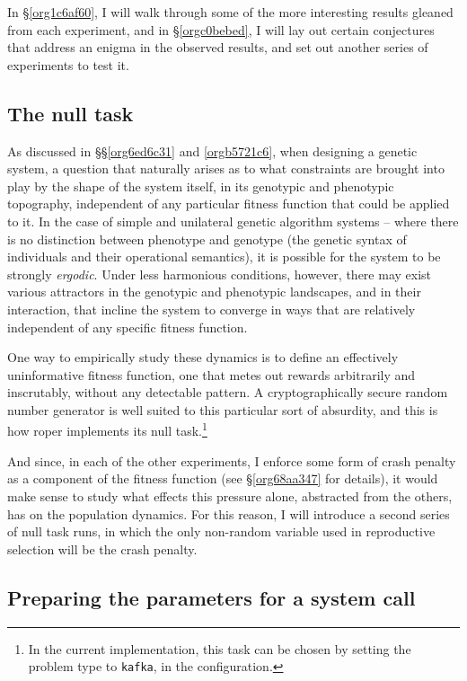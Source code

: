\documentclass[12pt,glossary]{dalthesis}
\begin{document}
In \S \ref{org1c6af60}, I will walk through some of the more interesting results
gleaned from each experiment, and in \S \ref{orgc0bebed}, I will lay out certain
conjectures that address an enigma in the observed results, and set out another
series of experiments to test it. 

\subsection{The null task}
\label{sec:org5f51691}
\label{org21258f9}

As discussed in \S\S \ref{org6ed6c31} and \ref{orgb5721c6}, when designing a genetic
system, a question that naturally arises as to what constraints are brought into
play by the shape of the system itself, in its genotypic and phenotypic topography,
independent of any particular fitness function that could be applied to it. In the
case of simple and unilateral genetic algorithm systems -- where there is no distinction
between phenotype and genotype (the genetic syntax of individuals and their 
operational semantics), it is possible for the system to be strongly \emph{ergodic}.
Under less harmonious conditions, however, there may exist various attractors in
the genotypic and phenotypic landscapes, and in their interaction, that incline
the system to converge in ways that are relatively independent of any specific
fitness function. 

One way to empirically study these dynamics is to define an
effectively uninformative fitness function, one that metes out rewards arbitrarily
and inscrutably, without any detectable pattern. A cryptographically secure
random number generator is well suited to this particular sort of absurdity, and
this is how \gls{roper} implements its null task.\footnote{In the current implementation, this task can be chosen by setting the 
  problem type to \texttt{kafka}, in the configuration.} 

And since, in each of the other experiments, I enforce some form of crash penalty
as a component of the fitness function (see \S \ref{org68aa347} for details),
it would make sense to study what effects this pressure alone, abstracted from
the others, has on the population dynamics. For this reason, I will introduce
a second series of null task runs, in which the only non-random variable used
in reproductive selection will be the crash penalty. 

\subsection{Preparing the parameters for a system call}
\label{sec:org3224d8d}
\label{orgfde434a}
\end{document}
